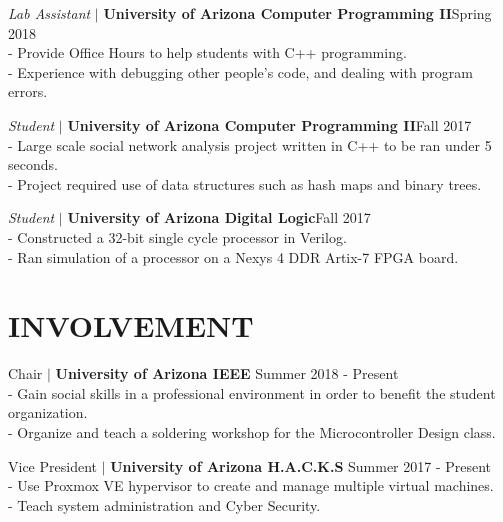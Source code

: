 \documentclass[line, 12pt]{res}
\newcommand\tab[1][0.5cm]{\hspace*{#1}}
\begin{document}
\begin{resume}
                {\sl Lab Assistant} $\mid$ \textbf{University of Arizona Computer Programming II}\hfill Spring 2018 \\
                 	\tab - Provide Office Hours to help students with C++ programming. \\
                 	\tab - Experience with debugging other people’s code, and dealing with program errors.


				{\sl Student} $\mid$ \textbf{University of Arizona Computer Programming II}\hfill Fall 2017 \\
						\tab - Large scale social network analysis project written in C++ to be ran under 5 seconds. \\
						\tab - Project required use of data structures such as hash maps and binary trees.

				{\sl Student} $\mid$ \textbf{University of Arizona Digital Logic}\hfill Fall 2017 \\
						\tab - Constructed a 32-bit single cycle processor in Verilog. \\
						\tab - Ran simulation of a processor on a Nexys 4 DDR Artix-7 FPGA board.

\section{INVOLVEMENT} 
	Chair $\mid$ \textbf{University of Arizona IEEE} \hfill Summer 2018 - Present \\
		\tab - Gain social skills in a professional environment in order to benefit the student organization. \\
		\tab - Organize and teach a soldering workshop for the Microcontroller Design class.
	
	Vice President $\mid$ \textbf{University of Arizona H.A.C.K.S} \hfill Summer 2017 - Present \\
		\tab - Use Proxmox VE hypervisor to create and manage multiple virtual machines. \\
		\tab - Teach system administration and Cyber Security.
	

\end{resume}
\end{document}
